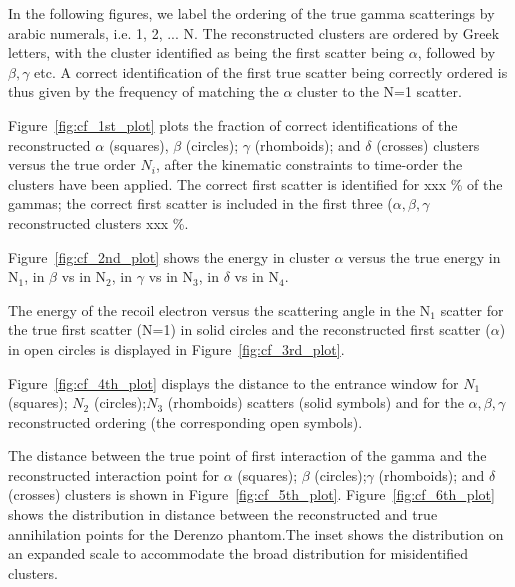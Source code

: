 \documentclass[12pt]{article}
\begin{document}
In the following figures, we label the ordering of the true gamma scatterings by
arabic numerals, i.e. 1, 2, ... N. The reconstructed clusters are ordered by Greek letters, with the cluster identified as being the first scatter being $\alpha$, followed by $\beta,\gamma$ etc.
A correct identification of the first true scatter being correctly ordered is thus given by the frequency of matching the $\alpha$ cluster to the N=1 scatter.

Figure~\ref{fig:cf_1st_plot} plots the fraction of correct identifications of the reconstructed $\alpha$ (squares), $\beta$  (circles); $\gamma$ (rhomboids); and $\delta$ (crosses) clusters versus the true order $N_i$, after the kinematic constraints to time-order the clusters have been applied.  The correct first scatter is identified for xxx \% of the gammas; the correct first scatter is included in the first three ($\alpha,\beta,\gamma$ reconstructed clusters xxx \%.

Figure~\ref{fig:cf_2nd_plot} shows the energy in cluster $\alpha$ versus the true energy in N$_1$,
                in $\beta$ vs in N$_2$, in $\gamma$ vs in N$_3$, in $\delta$ vs in
                N$_4$.

The energy of the recoil electron versus the scattering angle in the
                N$_1$ scatter for the true first scatter (N=1) in solid circles and the reconstructed first scatter ($\alpha$) in open circles is displayed in Figure~\ref{fig:cf_3rd_plot}.

Figure~\ref{fig:cf_4th_plot} displays the distance to the entrance window for $N_1$ (squares);
                $N_2$ (circles);$N_3$ (rhomboids) scatters (solid symbols) and for the $\alpha,\beta,\gamma$ reconstructed ordering (the corresponding open symbols).

The distance between the true point of first interaction of the gamma and the reconstructed interaction point for $\alpha$ (squares);
$\beta$ (circles);$\gamma$ (rhomboids); and $\delta $ (crosses) clusters is shown in
Figure~\ref{fig:cf_5th_plot}.  Figure~\ref{fig:cf_6th_plot} shows
   the distribution in distance between the reconstructed and true annihilation points for the Derenzo phantom.The inset shows the distribution on an expanded scale to accommodate  the broad distribution for misidentified clusters.

 \enlargethispage*{4.1in}
\end{document}

